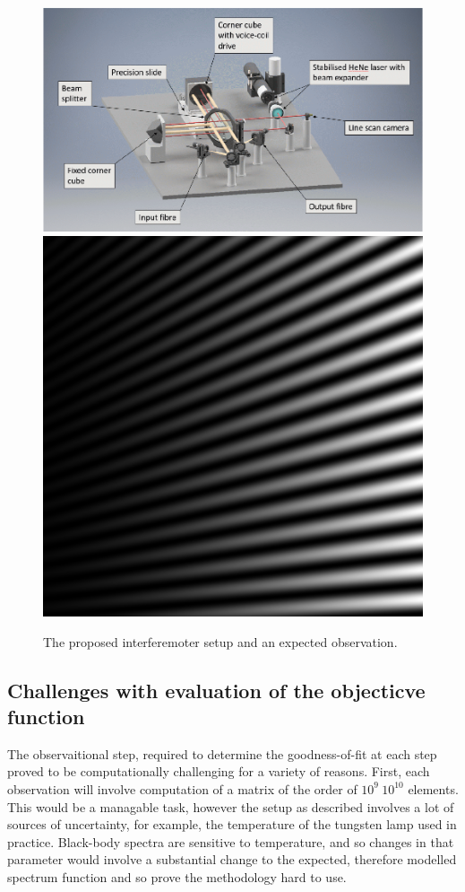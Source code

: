 \documentclass[12pt]{article}
\begin{document}
    \begin{figure}
    \caption{The proposed interferemoter setup and an expected observation.}
    \includegraphics[scale=0.4]{interferometer}
    \includegraphics[scale=0.35]{test.png}

    \end{figure}
    
     
    \subsection{Challenges with evaluation of the objecticve function}
        The observaitional step, required to determine the goodness-of-fit
        at each step proved to be computationally challenging for a variety 
        of reasons. First, each observation will involve computation of a 
        matrix of the order of $10^9 ~ 10^{10}$ elements. This would be a managable task,
        however the setup as described involves a lot of sources of uncertainty,
        for example, the temperature of the tungsten lamp used in practice. 
        Black-body spectra are sensitive to temperature, and so changes in that 
        parameter would involve a substantial change to the expected, therefore
        modelled spectrum function and so prove the methodology hard to use.
\end{document}
